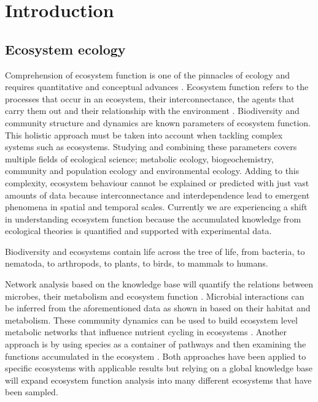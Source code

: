 % 
% 

\chapter{Introduction}
\label{cha:intro}

\section{Ecosystem ecology}
\label{sec:intro-ecosystem}

Comprehension of ecosystem function is one of the pinnacles of ecology and
requires quantitative and conceptual advances \parencite{Chapin_Matson_Vitousek_2011}.
Ecosystem function refers to the processes that occur in an ecosystem, their
interconnectance, the agents that carry them out
and their relationship with the environment \parencite{Chapin_Matson_Vitousek_2011}. Biodiversity
\parencite{hooperEFFECTSBIODIVERSITYECOSYSTEM2005, loreau2001Biodiversity}
and community structure and dynamics \parencite{gonze2018Microbial,morris2020linking}
are known parameters of ecosystem function. This holistic approach must be taken
into account when tackling complex systems such as ecosystems. Studying and
combining these parameters covers multiple fields of ecological science;
metabolic ecology, biogeochemistry, community and population ecology and
environmental ecology. Adding to this complexity, ecosystem behaviour cannot be
explained or predicted with just vast amounts of data because interconnectance
and interdependence lead to emergent phenomena in spatial and temporal scales.
Currently we are experiencing a shift in understanding ecosystem function
because the accumulated knowledge from ecological theories is quantified and
supported with experimental data.

Biodiversity and ecosystems contain life across the tree of life, from
bacteria, to nematoda, to arthropods, to plants, to birds, to mammals to 
humans.



Network analysis based on the knowledge base will quantify the relations
between microbes, their metabolism and ecosystem
function \parencite{graham2016Microbes,muller2018Using, perez_garcia2016Metabolic}.
Microbial interactions can be inferred from the aforementioned data as shown
in \parencite{machado2021Polarization} based on their habitat and metabolism.
These community dynamics can be used to build ecosystem level metabolic
networks \parencite{perez_garcia2016Metabolic} that influence nutrient cycling in
ecosystems \parencite{bauer2018Network}. Another approach is by using species as a
container of pathways and then examining the functions accumulated in the
ecosystem \parencite{loucaDecouplingFunctionTaxonomy2016}. Both approaches have
been applied to specific ecosystems with applicable results but relying on a
global knowledge base will expand ecosystem function analysis into many
different ecosystems that have been sampled.

